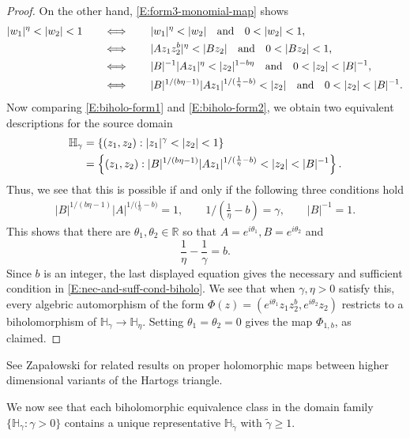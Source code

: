 \documentclass[letterpaper,11pt,reqno]{amsart}
\theoremstyle{plain}
\theoremstyle{definition}
\theoremstyle{remark}
\theoremstyle{remark}
\numberwithin{equation}{section}
\newcommand{\wt}{\widetilde}
\newcommand{\h}{{\mathbb H}}
\newcommand{\R}{{\mathbb R}}
\begin{document}
\begin{proof}
On the other hand, \eqref{E:form3-monomial-map} shows
\begin{align}
|w_1|^\eta < |w_2| < 1 \qquad &\Longleftrightarrow \qquad |w_1|^\eta < |w_2| \notag \quad \mathrm{and} \quad 0 < |w_2| < 1, \notag \\
&\Longleftrightarrow \qquad |A z_1 z_2^b|^\eta < |B z_2| \quad \mathrm{and} \quad 0 < |B z_2| < 1, \notag \\
&\Longleftrightarrow \qquad |B|^{-1} |A z_1|^\eta < |z_2|^{1-b\eta} \notag \quad \mathrm{and} \quad 0 < |z_2| < |B|^{-1}, \notag \\
&\Longleftrightarrow \qquad |B|^{1/(b\eta-1)} |A z_1|^{1 / {(\frac{1}{\eta}-b})} < |z_2| \quad \mathrm{and} \quad 0 < |z_2| < |B|^{-1}. \label{E:biholo-form2}
\end{align}
Now comparing \eqref{E:biholo-form1} and \eqref{E:biholo-form2}, we obtain two equivalent descriptions for the source domain
\begin{align}
\h_\gamma &= \{ (z_1,z_2) : |z_1|^\gamma < |z_2| < 1 \} \notag \\
&=  \left\{ (z_1,z_2) : |B|^{1/(b\eta-1)} | A z_1|^{1 / {(\frac{1}{\eta}-b})} < |z_2| < |B|^{-1} \right\}. 
\end{align}
Thus, we see that this is possible if and only if the following three conditions hold
\begin{align}
|B|^{1/(b\eta-1)} |A|^{1 / {(\frac{1}{\eta}-b})} = 1, \qquad 1/(\tfrac{1}{\eta}-b) = \gamma, \qquad |B|^{-1} = 1.
\end{align}
This shows that there are $\theta_1,\theta_2 \in \R$ so that $A = e^{i\theta_1}, B = e^{i\theta_2}$ and 
\begin{equation*}
\frac{1}{\eta} - \frac{1}{\gamma} = b.
\end{equation*}
Since $b$ is an integer, the last displayed equation gives the necessary and sufficient condition in \eqref{E:nec-and-suff-cond-biholo}.
We see that when $\gamma,\eta > 0$ satisfy this, every algebric automorphism of the form $\Phi(z) = (e^{i\theta_1} z_1 z_2^b, e^{i\theta_2} z_2)$ restricts to a biholomorphism of $\h_\gamma \to \h_\eta$.
Setting $\theta_1 = \theta_2 = 0$ gives the map $\Phi_{1,b}$, as claimed.
\end{proof}

See Zapa\l owski \cite{Zapalowski17} for related results on proper holomorphic maps between higher dimensional variants of the Hartogs triangle.

We now see that each biholomorphic equivalence class in the domain family $\{\h_\gamma : \gamma > 0 \}$ contains a unique representative $\h_{\wt\gamma}$ with $\wt\gamma \ge 1$.
\end{document}

